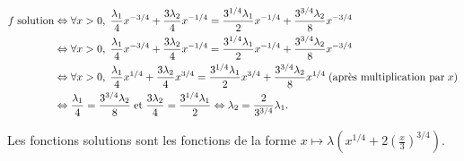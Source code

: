 {{\begin{align*}\ensuremath
f\;\text{solution}&\Leftrightarrow\forall x>0,\; \frac{\lambda_1}{4}x^{-3/4}+ \frac{3\lambda_2}{4}x^{-1/4}= \frac{3^{1/4}\lambda_1}{2}x^{-1/4}+ \frac{3^{3/4}\lambda_2}{8}x^{-3/4}\\
 &\Leftrightarrow\forall x>0,\; \frac{\lambda_1}{4}x^{-3/4}+ \frac{3\lambda_2}{4}x^{-1/4}= \frac{3^{1/4}\lambda_1}{2}x^{-1/4}+ \frac{3^{3/4}\lambda_2}{8}x^{-3/4}\\
 &\Leftrightarrow\forall x>0,\; \frac{\lambda_1}{4}x^{1/4}+ \frac{3\lambda_2}{4}x^{3/4}= \frac{3^{1/4}\lambda_1}{2}x^{3/4}+ \frac{3^{3/4}\lambda_2}{8}x^{1/4}\;(\text{après multiplication par}\;x)\\
 &\Leftrightarrow \frac{\lambda_1}{4}= \frac{3^{3/4}\lambda_2}{8}\;\text{et}\; \frac{3\lambda_2}{4}= \frac{3^{1/4}\lambda_1}{2}\Leftrightarrow\lambda_2= \frac{2}{3^{3/4}}\lambda_1.
\end{align*}

Les fonctions solutions sont les fonctions de la forme $x\mapsto\lambda\left(x^{1/4}+2\left( \frac{x}{3}\right)^{3/4}\right)$.
}
}
